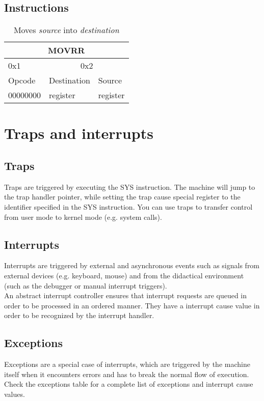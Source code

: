 \documentclass{article}
\begin{document}
\subsection{Instructions}
\begin{table}[h!]
\centering
\begin{tabular} { | p{2cm} | | p{2cm} | p{2cm} |}
  \hline
  \multicolumn{3}{|c|}{MOVRR}\\
  \hline
  0x1 & \multicolumn{2}{|c|}{0x2}\\
  \hline
  Opcode & Destination & Source\\
  00000000 & register & register\\
  \hline
\end{tabular}
\caption{Moves \textit{source} into \textit{destination}}
\end{table}

\section{Traps and interrupts}
\subsection{Traps}
Traps are triggered by executing the SYS instruction. The machine will jump to the trap handler pointer, while setting the trap cause special register to the identifier specified in the SYS instruction. You can use traps to transfer control from user mode to kernel mode (e.g. system calls).
\subsection{Interrupts}
Interrupts are triggered by external and asynchronous events such as signals from external devices (e.g. keyboard, mouse) and from the didactical environment (such as the debugger or manual interrupt triggers). \\An abstract interrupt controller ensures that interrupt requests are queued in order to be processed in an ordered manner. They have a interrupt cause value in order to be recognized by the interrupt handler.
\subsection{Exceptions}
Exceptions are a special case of interrupts, which are triggered by the machine itself when it encounters errors and has to break the normal flow of execution. Check the exceptions table for a complete list of exceptions and interrupt cause values.

\newpage
\end{document}
